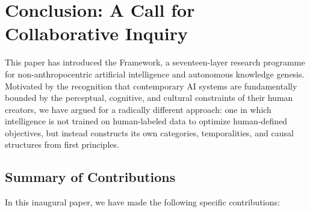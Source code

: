 \section{Conclusion: A Call for Collaborative Inquiry}
\label{sec:conclusion}

This paper has introduced the \Apeiron{} Framework, a seventeen-layer research programme for non-anthropocentric artificial intelligence and autonomous knowledge genesis. Motivated by the recognition that contemporary AI systems are fundamentally bounded by the perceptual, cognitive, and cultural constraints of their human creators, we have argued for a radically different approach: one in which intelligence is not trained on human-labeled data to optimize human-defined objectives, but instead constructs its own categories, temporalities, and causal structures from first principles.

\subsection*{Summary of Contributions}

In this inaugural paper, we have made the following specific contributions:


